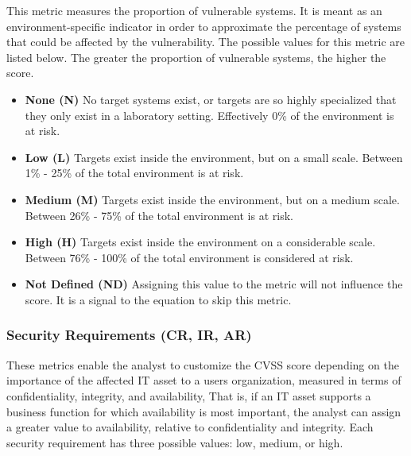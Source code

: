         This metric measures the proportion of vulnerable systems. It is meant
        as an environment-specific indicator in order to approximate the
        percentage of systems that could be affected by the vulnerability. The
        possible values for this metric are listed below. The greater the
        proportion of vulnerable systems, the higher the score.

        \begin{itemize}
          \item
            \textbf{None (N)} No target systems exist, or targets are so highly
            specialized that they only exist in a laboratory setting. Effectively
            0\% of the environment is at risk.
          \item
            \textbf{Low (L)} Targets exist inside the environment, but on a small
            scale. Between 1\% - 25\% of the total environment is at risk.
          \item
            \textbf{Medium (M)} Targets exist inside the environment, but on a
            medium scale. Between 26\% - 75\% of the total environment is at risk.
          \item
            \textbf{High (H)} Targets exist inside the environment on a
            considerable scale. Between 76\% - 100\% of the total environment is
            considered at risk.
          \item
            \textbf{Not Defined (ND)} Assigning this value to the metric will not
            influence the score. It is a signal to the equation to skip this
            metric.
        \end{itemize}

      \subsubsection{Security Requirements (CR, IR, AR)}\label{subsubsec:security-requirements-cr-ir-ar}

        These metrics enable the analyst to customize the CVSS score depending
        on the importance of the affected IT asset to a users organization,
        measured in terms of confidentiality, integrity, and availability, That
        is, if an IT asset supports a business function for which availability
        is most important, the analyst can assign a greater value to
        availability, relative to confidentiality and integrity. Each security
        requirement has three possible values: low, medium, or high.

